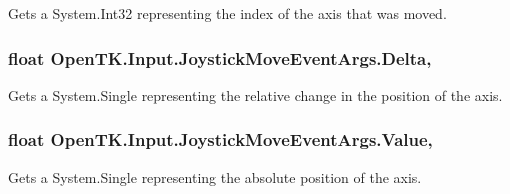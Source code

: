 Gets a System.\-Int32 representing the index of the axis that was moved. 

\hypertarget{class_open_t_k_1_1_input_1_1_joystick_move_event_args_a868d586a5500d5729539f77e0702deff}{
\subsubsection[{Delta}]{\setlength{\rightskip}{0pt plus 5cm}float Open\-T\-K.\-Input.\-Joystick\-Move\-Event\-Args.\-Delta\hspace{0.3cm}{\ttfamily [get]}, {\ttfamily [set]}}}\label{class_open_t_k_1_1_input_1_1_joystick_move_event_args_a868d586a5500d5729539f77e0702deff}


Gets a System.\-Single representing the relative change in the position of the axis. 

\hypertarget{class_open_t_k_1_1_input_1_1_joystick_move_event_args_a8944831f91ed3f63c6ac77472e42c2a2}{
\subsubsection[{Value}]{\setlength{\rightskip}{0pt plus 5cm}float Open\-T\-K.\-Input.\-Joystick\-Move\-Event\-Args.\-Value\hspace{0.3cm}{\ttfamily [get]}, {\ttfamily [set]}}}\label{class_open_t_k_1_1_input_1_1_joystick_move_event_args_a8944831f91ed3f63c6ac77472e42c2a2}


Gets a System.\-Single representing the absolute position of the axis. 

